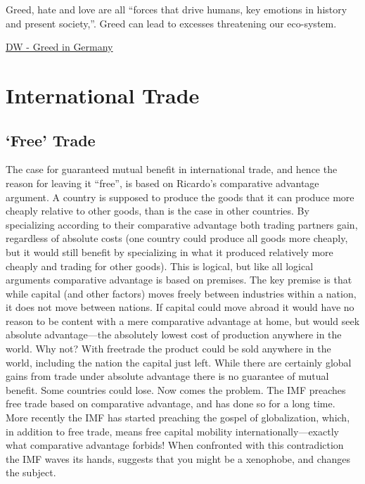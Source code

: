 \documentclass[
]{book}
\begin{document}
Greed, hate and love are all ``forces that drive humans, key emotions in history and present society,''.
Greed can lead to excesses threatening our eco-system.

\href{https://www.dw.com/en/exploring-the-impact-of-greed-in-germany/a-56898509}{DW - Greed in Germany}

\hypertarget{international-trade}{%
\chapter{International Trade}\label{international-trade}}

\hypertarget{free-trade}{%
\section{`Free' Trade}\label{free-trade}}

The case for guaranteed mutual benefit in international trade, and hence the reason for leaving it ``free'', is based on
Ricardo's comparative advantage argument. A country is supposed to produce the goods that it can produce more
cheaply relative to other goods, than is the case in other countries. By specializing according to their comparative
advantage both trading partners gain, regardless of absolute costs (one country could produce all goods more cheaply,
but it would still benefit by specializing in what it produced relatively more cheaply and trading for other goods). This
is logical, but like all logical arguments comparative advantage is based on premises. The key premise is that while
capital (and other factors) moves freely between industries within a nation, it does not move between nations. If
capital could move abroad it would have no reason to be content with a mere comparative advantage at home, but
would seek absolute advantage---the absolutely lowest cost of production anywhere in the world. Why not? With freetrade the product could be sold anywhere in the world, including the nation the capital just left. While there are
certainly global gains from trade under absolute advantage there is no guarantee of mutual benefit. Some countries
could lose.
Now comes the problem. The IMF preaches free trade based on comparative advantage, and has done so for a long
time. More recently the IMF has started preaching the gospel of globalization, which, in addition to free trade, means
free capital mobility internationally---exactly what comparative advantage forbids! When confronted with this
contradiction the IMF waves its hands, suggests that you might be a xenophobe, and changes the subject.
\end{document}
